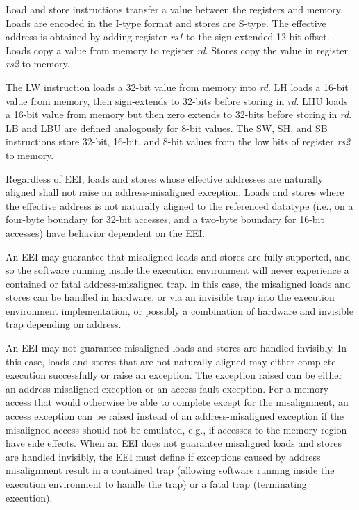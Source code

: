 Load and store instructions transfer a value between the registers and
memory.  Loads are encoded in the I-type format and stores are
S-type.  The effective address is obtained by adding register
{\em rs1} to the sign-extended 12-bit offset.  Loads copy a value
from memory to register {\em rd}.  Stores copy the value in register
{\em rs2} to memory.

The LW instruction loads a 32-bit value from memory into {\em rd}.  LH
loads a 16-bit value from memory, then sign-extends to 32-bits before
storing in {\em rd}. LHU loads a 16-bit value from memory but then
zero extends to 32-bits before storing in {\em rd}.  LB and LBU are
defined analogously for 8-bit values.  The SW, SH, and SB instructions
store 32-bit, 16-bit, and 8-bit values from the low bits of register
{\em rs2} to memory.

Regardless of EEI, loads and stores whose effective addresses are
naturally aligned shall not raise an address-misaligned exception.
Loads and stores where the effective address is not naturally aligned
to the referenced datatype (i.e., on a four-byte boundary for 32-bit
accesses, and a two-byte boundary for 16-bit accesses) have behavior
dependent on the EEI.

An EEI may guarantee that misaligned loads and stores are fully
supported, and so the software running inside the execution
environment will never experience a contained or fatal
address-misaligned trap.  In this case, the misaligned loads and
stores can be handled in hardware, or via an invisible trap into the
execution environment implementation, or possibly a combination of
hardware and invisible trap depending on address.

An EEI may not guarantee misaligned loads and stores are handled
invisibly.  In this case, loads and stores that are not naturally
aligned may either complete execution successfully or raise an
exception.  The exception raised can be either an address-misaligned
exception or an access-fault exception.  For a memory access that would
otherwise be able to complete except for the misalignment, an access
exception can be raised instead of an address-misaligned exception if
the misaligned access should not be emulated, e.g., if accesses to the
memory region have side effects.  When an EEI does not guarantee
misaligned loads and stores are handled invisibly, the EEI must define
if exceptions caused by address misalignment result in a contained
trap (allowing software running inside the execution environment to
handle the trap) or a fatal trap (terminating execution).

